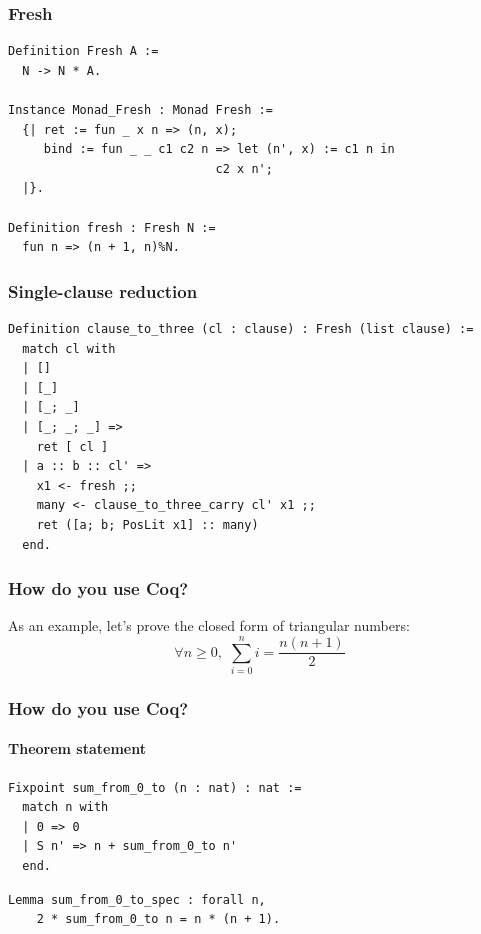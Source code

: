 \documentclass{beamer}
\begin{document}
\begin{frame}[fragile]
  \frametitle{Fresh}

  \begin{verbatim}
Definition Fresh A :=
  N -> N * A.

Instance Monad_Fresh : Monad Fresh :=
  {| ret := fun _ x n => (n, x);
     bind := fun _ _ c1 c2 n => let (n', x) := c1 n in
                             c2 x n';
  |}.

Definition fresh : Fresh N :=
  fun n => (n + 1, n)%N.
  \end{verbatim}
\end{frame}

\begin{frame}[fragile]
  \frametitle{Single-clause reduction}

  \begin{verbatim}
Definition clause_to_three (cl : clause) : Fresh (list clause) :=
  match cl with
  | []
  | [_]
  | [_; _]
  | [_; _; _] =>
    ret [ cl ]
  | a :: b :: cl' =>
    x1 <- fresh ;;
    many <- clause_to_three_carry cl' x1 ;;
    ret ([a; b; PosLit x1] :: many)
  end.
  \end{verbatim}
\end{frame}


\begin{frame}
  \frametitle{How do you use Coq?}

  As an example, let's prove the closed form of triangular numbers:
  $$ \forall n \geq 0, \,\, \sum_{i = 0}^n i = \frac{n (n + 1)}{2} $$
\end{frame}

\begin{frame}[fragile]
  \frametitle{How do you use Coq?}
  \framesubtitle{Theorem statement}

  \begin{verbatim}
Fixpoint sum_from_0_to (n : nat) : nat :=
  match n with
  | 0 => 0
  | S n' => n + sum_from_0_to n'
  end.
  \end{verbatim}

  \pause

  \begin{verbatim}
Lemma sum_from_0_to_spec : forall n,
    2 * sum_from_0_to n = n * (n + 1).
  \end{verbatim}
\end{frame}
\end{document}
